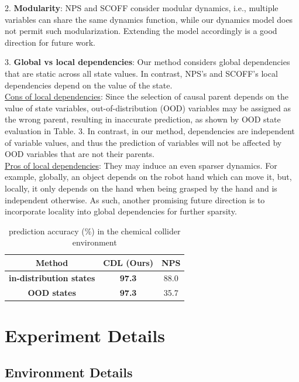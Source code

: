 2. \textbf{Modularity}: NPS and SCOFF consider modular dynamics, i.e., multiple variables can share the same dynamics function, while our dynamics model does not permit such modularization. Extending the model accordingly is a good direction for future work.

3. \textbf{Global vs local dependencies}: Our method considers global dependencies that are static across all state values. In contrast, NPS's and SCOFF's local dependencies depend on the value of the state. \\
\underline{Cons of local dependencies}: Since the selection of causal parent depends on the value of state variables, out-of-distribution (OOD) variables may be assigned as the wrong parent, resulting in inaccurate prediction, as shown by OOD state evaluation in Table. 3. In contrast, in our method, dependencies are independent of variable values, and thus the prediction of variables will not be affected by OOD variables that are not their parents. \\
\underline{Pros of local dependencies}: They may induce an even sparser dynamics. For example, globally, an object depends on the robot hand which can move it, but, locally, it only depends on the hand when being grasped by the hand and is independent otherwise. As such, another promising future direction is to incorporate locality into global dependencies for further sparsity.

\begin{table}
\centering
\begin{small}
\caption{prediction accuracy (\%) in the chemical collider environment}
\begin{tabular}{ccc}
\toprule
\textbf{Method}         & \textbf{CDL} (Ours)   & \textbf{NPS} \\
\midrule
\textbf{in-distribution states} & \textbf{97.3}         & 88.0  \\
\textbf{OOD states}      & \textbf{97.3}         & 35.7  \\
\bottomrule
\end{tabular}
\end{small}
\vspace{-16pt}
\label{tab:nps_results}
\end{table}

\section{Experiment Details}
\subsection{Environment Details}
\label{app:environment}

